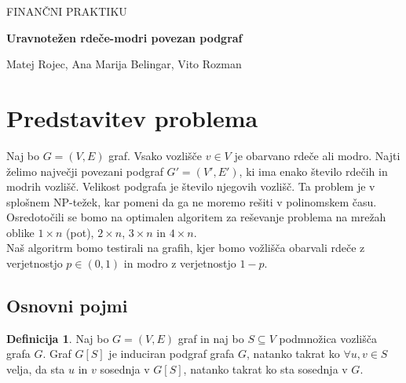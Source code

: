 \documentclass[a4paper, 11pt]{article}
\theoremstyle{definition}
\newtheorem{definicija}{Definicija}
\begin{document}
    \begin{titlepage}
        \begin{center}
            \vspace*{1cm}
            
            \LARGE
            FINANČNI PRAKTIKU
                
            \vspace{1cm}
            \huge
            \textbf{Uravnotežen rdeče-modri povezan podgraf}
                
            \vspace{1cm}
                
            \Large   
            Matej Rojec, Ana Marija Belingar, Vito Rozman 
        
            
            \vspace{2cm}
    
                
                    
        \end{center}
    \end{titlepage}

    \section{Predstavitev problema}

    Naj bo $G = (V, E)$ graf. Vsako vozlišče $v \in V $ je obarvano rdeče ali modro. 
    Najti želimo največji povezani podgraf $G' = (V', E')$, ki ima enako število rdečih in modrih vozlišč.
    Velikost podgrafa je število njegovih vozlišč. Ta problem je v splošnem NP-težek, kar pomeni da ga ne moremo
    rešiti v polinomskem času.\\
    Osredotočili se bomo na optimalen algoritem za reševanje problema na mrežah oblike $1 \times n$ (pot), $2 \times n$, 
    $3 \times n$ in $4 \times n$.\\
    Naš algoritrm bomo testirali na grafih, kjer bomo vožlišča obarvali rdeče z verjetnostjo $p \in (0,1)$ 
    in modro z verjetnostjo $1 - p$. 
    
    \subsection{Osnovni pojmi}
    
    \begin{definicija}
        Naj bo $G=(V,E)$ graf in naj bo $S \subseteq V$ podmnožica vozlišča grafa $G$. 
        Graf $G[S]$ je induciran podgraf grafa $G$, natanko takrat ko $\forall u, v \in S$ velja,
        da sta $u$ in $v$ sosednja v $G[S]$, natanko takrat ko sta sosednja v $G$.
    \end{definicija}
\end{document}
